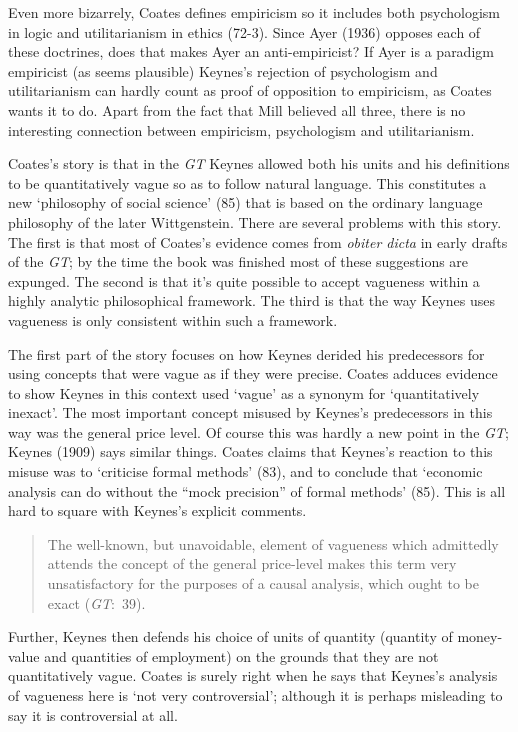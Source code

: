 \documentclass[noflushend]{philosophersimprint}
\begin{document}
Even more bizarrely, Coates defines empiricism so it includes both
psychologism in logic and utilitarianism in ethics (72-3). Since Ayer
(1936) opposes each of these doctrines, does that makes Ayer an
anti-empiricist? If Ayer is a paradigm empiricist (as seems plausible)
Keynes's rejection of psychologism and utilitarianism can hardly count
as proof of opposition to empiricism, as Coates wants it to do. Apart
from the fact that Mill believed all three, there is no interesting
connection between empiricism, psychologism and utilitarianism.

Coates's story is that in the \emph{GT} Keynes allowed both his units
and his definitions to be quantitatively vague so as to follow natural
language. This constitutes a new `philosophy of social science' (85)
that is based on the ordinary language philosophy of the later
Wittgenstein. There are several problems with this story. The first is
that most of Coates's evidence comes from \emph{obiter dicta} in early
drafts of the \emph{GT}; by the time the book was finished most of these
suggestions are expunged. The second is that it's quite possible to
accept vagueness within a highly analytic philosophical framework. The
third is that the way Keynes uses vagueness is only consistent within
such a framework.

The first part of the story focuses on how Keynes derided his
predecessors for using concepts that were vague as if they were precise.
Coates adduces evidence to show Keynes in this context used `vague' as a
synonym for `quantitatively inexact'. The most important concept misused
by Keynes's predecessors in this way was the general price level. Of
course this was hardly a new point in the \emph{GT}; Keynes (1909) says
similar things. Coates claims that Keynes's reaction to this misuse was
to `criticise formal methods' (83), and to conclude that `economic
analysis can do without the ``mock precision'' of formal methods' (85).
This is all hard to square with Keynes's explicit comments.

\begin{quote}
The well-known, but unavoidable, element of vagueness which admittedly
attends the concept of the general price-level makes this term very
unsatisfactory for the purposes of a causal analysis, which ought to be
exact (\emph{GT}:~39).
\end{quote}

Further, Keynes then defends his choice of units of quantity (quantity
of money-value and quantities of employment) on the grounds that they
are not quantitatively vague. Coates is surely right when he says that
Keynes's analysis of vagueness here is `not very controversial';
although it is perhaps misleading to say it is controversial at all.
\end{document}
